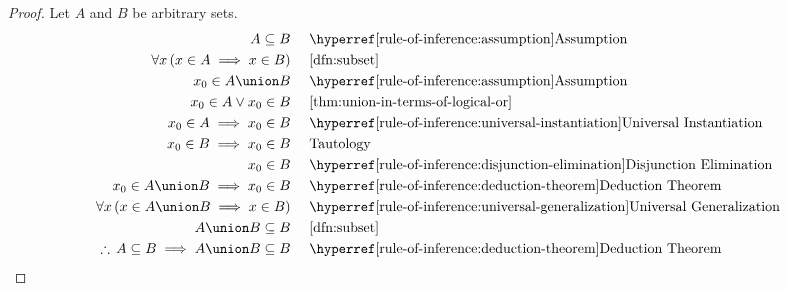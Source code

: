 \begin{proof}
    Let \( A \) and \( B \) be arbitrary sets.
    \begin{equation*}
        \begin{aligned}
            A \subseteq B& \\
            \forall x \, \mleft( x \in A \implies x \in B \mright)& \\
            x_{0} \in A \union B& \\
            x_{0} \in A \lor x_{0} \in B& \\
            x_{0} \in A \implies x_{0} \in B& \\
            x_{0} \in B \implies x_{0} \in B& \\
            x_{0} \in B& \\
            x_{0} \in A \union B \implies x_{0} \in B& \\
            \forall x \, \mleft( x \in A \union B \implies x \in B \mright)& \\
            A \union B \subseteq B& \\
            \therefore \, A \subseteq B \implies A \union B \subseteq B&
        \end{aligned}
        \text{  }
        \begin{aligned}
            &\quad\text{\aref{rule-of-inference:assumption}{Assumption}}\\
            &\quad\text{\cref{dfn:subset}}\\
            &\quad\text{\aref{rule-of-inference:assumption}{Assumption}}\\
            &\quad\text{\cref{thm:union-in-terms-of-logical-or}}\\
            &\quad\text{\aref{rule-of-inference:universal-instantiation}{Universal Instantiation}}\\
            &\quad\text{Tautology}\\
            &\quad\text{\aref{rule-of-inference:disjunction-elimination}{Disjunction Elimination}}\\
            &\quad\text{\aref{rule-of-inference:deduction-theorem}{Deduction Theorem}}\\
            &\quad\text{\aref{rule-of-inference:universal-generalization}{Universal Generalization}}\\
            &\quad\text{\cref{dfn:subset}}\\
            &\quad\text{\aref{rule-of-inference:deduction-theorem}{Deduction Theorem}}
        \end{aligned}

\end{equation*}
\end{proof}
